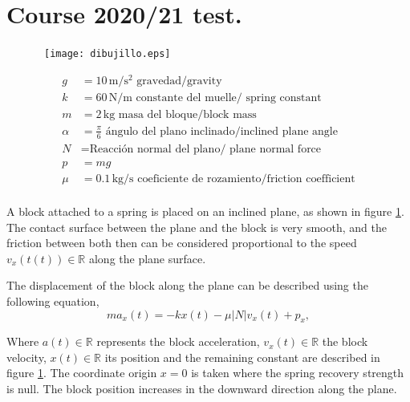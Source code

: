 \section{Course 2020/21 test.}
\begin{figure}[h]
\begin{minipage}{0.5\textwidth} \ 
\texttt{[image: dibujillo.eps]}
\end{minipage}
\begin{minipage}{0.5\textwidth}
\begin{align*}
g &= 10 \, \text{m}/\text{s}^2 \text{\ gravedad/gravity}\\
k &= 60 \, \text{N}/\text{m} \text{\ constante del muelle/ spring constant}\\
m &= 2 \, \text{kg} \text{\ masa del bloque/block mass}\\
\alpha &= \frac{\pi}{6} \text{\ ángulo del plano inclinado/inclined plane angle}\\
N &= \text{Reacción normal del plano/ plane normal force}\\
p &= mg\\
	\mu &= 0.1 \, \text{kg}/\text{s} \text{\ coeficiente de rozamiento/friction coefficient}\\
\end{align*}

\end{minipage}
\label{fig1}
\end{figure}

A block attached to a spring is placed on an inclined plane, as shown in figure \ref{fig1}. The contact surface between the plane and the block is very smooth, and the friction between both then can be considered proportional to the speed $v_x(t(t))\in\mathbb{R}$ along the plane surface.

The displacement of the block along the plane can be described using the following equation,
\begin{equation}
	ma_{x}(t) = -kx(t) -\mu \lvert N \lvert v_x(t) + p_x, \label{eq: f}
\end{equation}

Where  $a(t)\in\mathbb{R}$ represents the block acceleration, $v_x(t) \in\mathbb{R}$ the block velocity, $x(t)\in\mathbb{R}$ its position and the remaining constant are described in figure \ref{fig1}. The coordinate origin $x=0$ is taken where the spring recovery strength is null. The block position increases in the downward direction along the plane.

